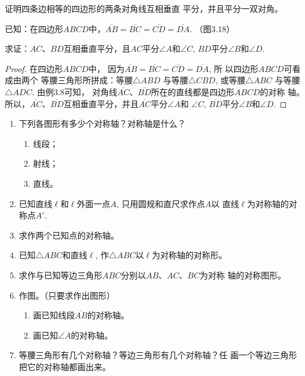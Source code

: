 \begin{example}
    证明四条边相等的四边形的两条对角线互相垂直
平分，并且平分一双对角。

已知：在四边形$ABCD$中，$\overline{AB}=\overline{BC}=\overline{CD}=\overline{DA}$.
（图3.18）
\begin{figure}[htp]
    \centering
    \caption{}
\end{figure}

求证：$AC$、$BD$互相垂直平分，且$AC$平分$\angle A$和$\angle C$,
$BD$平分$\angle B$和$\angle D$.
\end{example}

\begin{proof}
在四边形$ABCD$中，
因为$\overline{AB}=\overline{BC}=\overline{CD}=\overline{DA}$, 所
以四边形$ABCD$可看成由两个
等腰三角形所拼成：等腰$\triangle ABD$
与等腰$\triangle CBD$, 或等腰$\triangle ABC$
与等腰$\triangle ADC$. 由例3.8可知，
对角线$\overline{AC}$、$\overline{BD}$所在的直线都是四边形$ABCD$的对称
轴。所以，$\overline{AC}$、$\overline{BD}$互相垂直平分，并且$\overline{AC}$平分$\angle A$和
$\angle C$, $\overline{BD}$平分$\angle B$和$\angle D$.
\end{proof}

\begin{ex}
\begin{enumerate}
    \item 下列各图形有多少个对称轴？对称轴是什么？
    \begin{multicols}{3}
        \begin{enumerate}
            \item 线段；\item 射线；\item 直线。
        \end{enumerate}
    \end{multicols}
    \item 已知直线$\ell$和$\ell$外面一点$A$, 只用圆规和直尺求作点$A$以
    直线$\ell$为对称轴的对称点$A'$.
    \item 求作两个已知点的对称轴。
    \item 已知$\triangle ABC$和直线$\ell$, 作$\triangle ABC$以$\ell$为对称轴的对称形。
    \item 求作与已知等边三角形$ABC$分别以$AB$、$AC$、$BC$为对称
    轴的对称图形。
    \item 作图。（只要求作出图形）
    \begin{enumerate}
    \item 画已知线段$\overline{AB}$的对称轴。
    \item 画已知$\angle A$的对称轴。
    \end{enumerate}
    \item 等腰三角形有几个对称轴？等边三角形有几个对称轴？任
    画一个等边三角形把它的对称轴都画出来。
\end{enumerate}
\end{ex}

